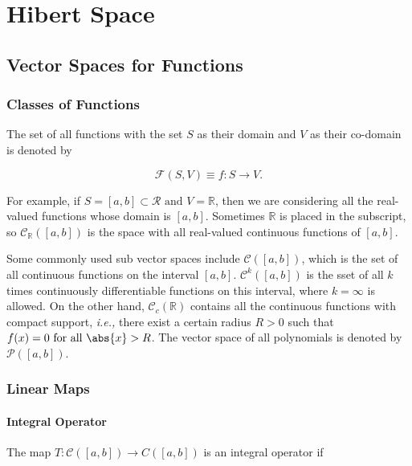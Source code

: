 \documentclass[a4paper,12pt]{report}
\begin{document}
\chapter{Hibert Space}

\section{Vector Spaces for Functions}

\subsection{Classes of Functions}

The set of all functions with the set \(S\) as their domain and \(V\) as their co-domain is denoted by 

\begin{equation}
    \mathcal{F}(S,V) \equiv {f:S \to V}.
\end{equation}

For example, if \(S = [a,b] \subset \mathcal{R} \text { and }  V = \mathbb{R}\), then we are considering all the real-valued functions whose domain is \([a,b]\). Sometimes \(\mathbb{R}\) is placed in the subscript, so \(\mathcal{C}_{\mathbb{R}}([a,b]) \) is the space with all real-valued continuous functions of \([a,b]\).

Some commonly used sub vector spaces include \(\mathcal{C}([a,b])\), which is the set of all continuous functions on the interval \([a,b]\). \(\mathcal{C}^{k}([a,b]) \) is the sset of all \(k\) times continuously differentiable functions on this interval, where \(k = \infty\) is allowed. On the other hand, \(\mathcal{C}_{c} (\mathbb{R})\) contains all the continuous functions with compact support, \textit{i.e.,} there exist a certain radius \(R > 0\) such that \(f(x) = 0 \text{ for all } \abs{x} > R  \). The vector space of all polynomials is denoted by \(\mathcal{P}([a,b])\).             

\subsection{Linear Maps}

\subsubsection{Integral Operator}

The map \(T:\mathcal{C}([a,b]) \to C([a,b])\) is an integral operator if
\end{document}
